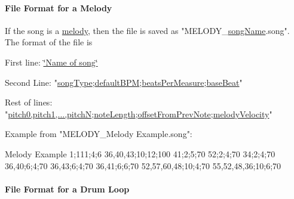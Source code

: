 \hypertarget{group___song_group_DocSongFileFormatMelody}{}\paragraph{File Format for a Melody}\label{group___song_group_DocSongFileFormatMelody}
If the song is a \hyperlink{group___song_group_DocSongMelody}{melody}, then the file is saved as "M\+E\+L\+O\+D\+Y\+\_\+\hyperlink{group___song_priv_var_ga6a5e6c1e4aa92939e2b5c1e3d9908df8}{song\+Name}.song". The format of the file is \begin{DoxyItemize}
\item First line\+: \hyperlink{group___song_priv_var_ga6a5e6c1e4aa92939e2b5c1e3d9908df8}{\char`\"{}\+Name of song\char`\"{}} \item Second Line\+: "\hyperlink{group___song_enums_gae681a1f001333e39fc1cb4fea97bfe1b}{song\+Type};\hyperlink{group___audio_DefBPM}{default\+B\+PM};\hyperlink{group___music_structs_acda79d249e7a1974a152832a881e9f0b}{beats\+Per\+Measure};\hyperlink{group___music_structs_aaf5b010a2541959c26f96630db042ee8}{base\+Beat}" \item Rest of lines\+: "\hyperlink{group___music_structs_aab23b49ea9d7961aef5091154ce45946}{pitch0,pitch1,...,pitchN};\hyperlink{group___music_structs_ac35cd02f5b3c00e3040b51e40e9e6c94}{note\+Length};\hyperlink{group___music_structs_ae281187907aed4c728c7981300dbebaf}{offset\+From\+Prev\+Note};\hyperlink{group___music_structs_a0c87d54ce8d28ea08fb4a526cb821c20}{melody\+Velocity}" \item Example from "M\+E\+L\+O\+D\+Y\+\_\+\+Melody Example.\+song"\+: \begin{DoxyVerb}Melody Example
1;111;4;6
36,40,43;10;12;100
41;2;5;70
52;2;4;70
34;2;4;70
36,40;6;4;70
36,43;6;4;70
36,41;6;6;70
52,57,60,48;10;4;70
55,52,48,36;10;6;70
\end{DoxyVerb}
\end{DoxyItemize}
\hypertarget{group___song_group_DocSongFileFormatDrumLoop}{}\paragraph{File Format for a Drum Loop}\label{group___song_group_DocSongFileFormatDrumLoop}
